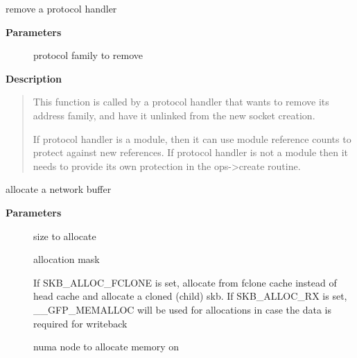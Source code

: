 \documentclass[a4paper,8pt,english]{sphinxmanual}
\begin{document}
\begin{fulllineitems}
\label{networking/kapi:c.sock_unregister}
remove a protocol handler

\end{fulllineitems}


\textbf{Parameters}
\begin{description}
\item[{}] \leavevmode
protocol family to remove

\end{description}

\textbf{Description}
\begin{quote}

This function is called by a protocol handler that wants to
remove its address family, and have it unlinked from the
new socket creation.

If protocol handler is a module, then it can use module reference
counts to protect against new references. If protocol handler is not
a module then it needs to provide its own protection in
the ops-\textgreater{}create routine.
\end{quote}

\begin{fulllineitems}
\label{networking/kapi:c.__alloc_skb}
allocate a network buffer

\end{fulllineitems}


\textbf{Parameters}
\begin{description}
\item[{}] \leavevmode
size to allocate

\item[{}] \leavevmode
allocation mask

\item[{}] \leavevmode
If SKB\_ALLOC\_FCLONE is set, allocate from fclone cache
instead of head cache and allocate a cloned (child) skb.
If SKB\_ALLOC\_RX is set, \_\_GFP\_MEMALLOC will be used for
allocations in case the data is required for writeback

\item[{}] \leavevmode
numa node to allocate memory on

\end{description}
\end{document}
